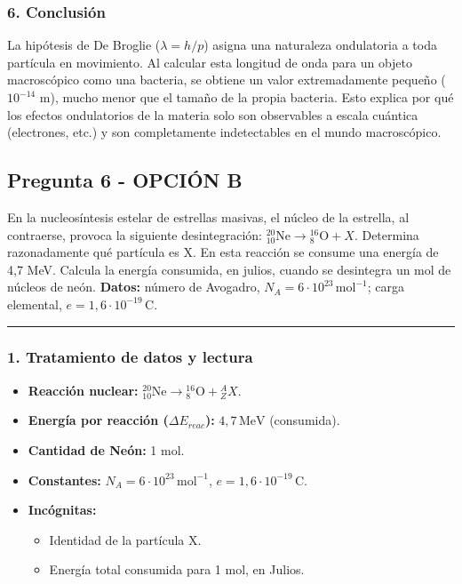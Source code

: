 \subsubsection*{6. Conclusión}
\begin{cajaconclusion}
La hipótesis de De Broglie ($\lambda=h/p$) asigna una naturaleza ondulatoria a toda partícula en movimiento. Al calcular esta longitud de onda para un objeto macroscópico como una bacteria, se obtiene un valor extremadamente pequeño ($10^{-14}$ m), mucho menor que el tamaño de la propia bacteria. Esto explica por qué los efectos ondulatorios de la materia solo son observables a escala cuántica (electrones, etc.) y son completamente indetectables en el mundo macroscópico.
\end{cajaconclusion}

\newpage

\subsection{Pregunta 6 - OPCIÓN B}
\label{subsec:6B_2019_jul_ext}

\begin{cajaenunciado}
En la nucleosíntesis estelar de estrellas masivas, el núcleo de la estrella, al contraerse, provoca la siguiente desintegración: ${}_{10}^{20}\text{Ne} \to {}_{8}^{16}\text{O} + X$. Determina razonadamente qué partícula es X. En esta reacción se consume una energía de 4,7 MeV. Calcula la energía consumida, en julios, cuando se desintegra un mol de núcleos de neón.
\textbf{Datos:} número de Avogadro, $N_A = 6\cdot10^{23}\,\text{mol}^{-1}$; carga elemental, $e=1,6\cdot10^{-19}\,\text{C}$.
\end{cajaenunciado}
\hrule

\subsubsection*{1. Tratamiento de datos y lectura}
\begin{itemize}
    \item \textbf{Reacción nuclear:} ${}_{10}^{20}\text{Ne} \to {}_{8}^{16}\text{O} + {}_{Z}^{A}X$.
    \item \textbf{Energía por reacción ($\Delta E_{reac}$):} $4,7\,\text{MeV}$ (consumida).
    \item \textbf{Cantidad de Neón:} 1 mol.
    \item \textbf{Constantes:} $N_A = 6\cdot10^{23}\,\text{mol}^{-1}$, $e = 1,6\cdot10^{-19}\,\text{C}$.
    \item \textbf{Incógnitas:}
    \begin{itemize}
        \item Identidad de la partícula X.
        \item Energía total consumida para 1 mol, en Julios.
    \end{itemize}
\end{itemize}


